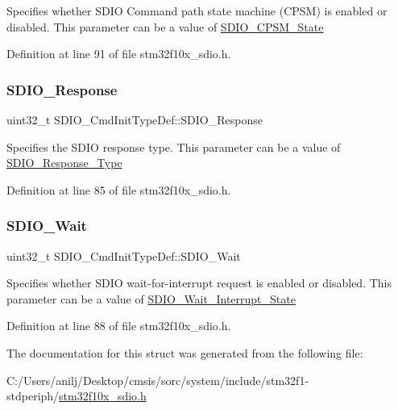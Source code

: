 Specifies whether S\+D\+IO Command path state machine (C\+P\+SM) is enabled or disabled. This parameter can be a value of \hyperlink{group___s_d_i_o___c_p_s_m___state}{S\+D\+I\+O\+\_\+\+C\+P\+S\+M\+\_\+\+State} 

Definition at line 91 of file stm32f10x\+\_\+sdio.\+h.

\mbox{\label{struct_s_d_i_o___cmd_init_type_def_aecb203e21321126d5f05c34787cacfd2}} 
\subsubsection{\texorpdfstring{S\+D\+I\+O\+\_\+\+Response}{SDIO\_Response}}
{\footnotesize\ttfamily uint32\+\_\+t S\+D\+I\+O\+\_\+\+Cmd\+Init\+Type\+Def\+::\+S\+D\+I\+O\+\_\+\+Response}

Specifies the S\+D\+IO response type. This parameter can be a value of \hyperlink{group___s_d_i_o___response___type}{S\+D\+I\+O\+\_\+\+Response\+\_\+\+Type} 

Definition at line 85 of file stm32f10x\+\_\+sdio.\+h.

\mbox{\label{struct_s_d_i_o___cmd_init_type_def_a582258554233ff8550bd04d2d790c67c}} 
\subsubsection{\texorpdfstring{S\+D\+I\+O\+\_\+\+Wait}{SDIO\_Wait}}
{\footnotesize\ttfamily uint32\+\_\+t S\+D\+I\+O\+\_\+\+Cmd\+Init\+Type\+Def\+::\+S\+D\+I\+O\+\_\+\+Wait}

Specifies whether S\+D\+IO wait-\/for-\/interrupt request is enabled or disabled. This parameter can be a value of \hyperlink{group___s_d_i_o___wait___interrupt___state}{S\+D\+I\+O\+\_\+\+Wait\+\_\+\+Interrupt\+\_\+\+State} 

Definition at line 88 of file stm32f10x\+\_\+sdio.\+h.



The documentation for this struct was generated from the following file\+:\begin{DoxyCompactItemize}
\item 
C\+:/\+Users/anilj/\+Desktop/cmsis/sorc/system/include/stm32f1-\/stdperiph/\hyperlink{stm32f10x__sdio_8h}{stm32f10x\+\_\+sdio.\+h}\end{DoxyCompactItemize}
